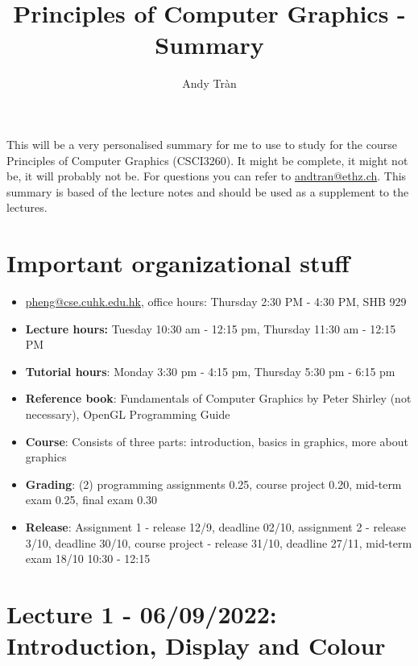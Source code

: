 \documentclass[11pt]{article}
\begin{document}
 
 
\title{Principles of Computer Graphics - Summary}%
\author{Andy Tràn}
 
\maketitle %

This will be a very personalised summary for me to use to study for the course Principles of Computer Graphics (CSCI3260). It might be complete, it might not be, it will probably not be. For questions you can refer to \href{mailto:andtran@ethz.ch}{andtran@ethz.ch}. This summary is based of the lecture notes and should be used as a supplement to the lectures. 

\tableofcontents

\newpage

\section{Important organizational stuff}
\begin{itemize}
    \item \href{mailto:pheng@cse.cuhk.edu.hk}{pheng@cse.cuhk.edu.hk}, office hours: Thursday 2:30 PM - 4:30 PM, SHB 929
    \item \textbf{Lecture hours:}  Tuesday 10:30 am - 12:15 pm, Thursday 11:30 am - 12:15 PM
    \item \textbf{Tutorial hours}: Monday 3:30 pm - 4:15 pm, Thursday 5:30 pm - 6:15 pm 
    \item \textbf{Reference book}: Fundamentals of Computer Graphics by Peter Shirley (not necessary), OpenGL Programming Guide
    \item \textbf{Course}: Consists of three parts: introduction, basics in graphics, more about graphics 
    \item \textbf{Grading}: (2) programming assignments 0.25, course project 0.20, mid-term exam 0.25, final exam 0.30
    \item \textbf{Release}: Assignment 1 - release 12/9, deadline 02/10, assignment 2 - release 3/10, deadline 30/10, course project - release 31/10, deadline 27/11, mid-term exam 18/10 10:30 - 12:15
\end{itemize}
\section{Lecture 1 - 06/09/2022: Introduction, Display and Colour}
\end{document}
